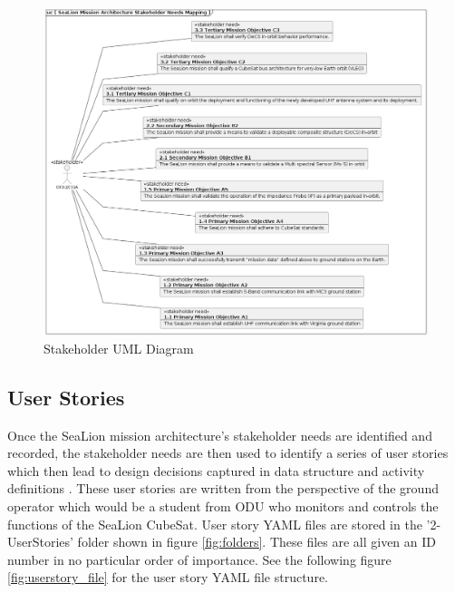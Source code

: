 \documentclass[journal,article,submit,pdftex,moreauthors]{Definitions/mdpi}
\begin{document}
\begin{figure}[H]
    \includegraphics[width=13.75 cm]{assets/uml_stakeholder.png}
    \caption{Stakeholder UML Diagram}
	\label{fig:uml_stakeholder}
    \end{figure}   
\unskip

\subsection{User Stories}
Once the SeaLion mission architecture's stakeholder needs are identified and recorded, the stakeholder needs are then used to identify a series of user stories which then lead to design decisions captured in data structure and activity definitions \cite{sealion_page}.  These user stories are written from the perspective of the ground operator which would be a student from ODU who monitors and controls the functions of the SeaLion CubeSat.  User story YAML files are stored in the '2-UserStories' folder shown in figure \ref{fig:folders}.  These files are all given an ID number in no particular order of importance.  See the following figure \ref{fig:userstory_file} for the user story YAML file structure.
\end{document}
